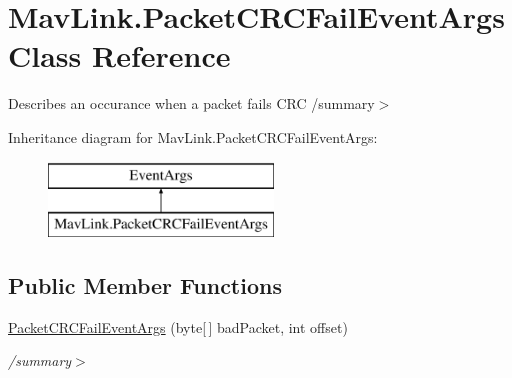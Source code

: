 \hypertarget{classMavLink_1_1PacketCRCFailEventArgs}{}\section{Mav\+Link.\+Packet\+C\+R\+C\+Fail\+Event\+Args Class Reference}
\label{classMavLink_1_1PacketCRCFailEventArgs}


Describes an occurance when a packet fails C\+RC /summary$>$  


Inheritance diagram for Mav\+Link.\+Packet\+C\+R\+C\+Fail\+Event\+Args\+:\begin{figure}[H]
\begin{center}
\leavevmode
\includegraphics[height=2.000000cm]{classMavLink_1_1PacketCRCFailEventArgs}
\end{center}
\end{figure}
\subsection*{Public Member Functions}
\begin{DoxyCompactItemize}
\item 
\mbox{\label{classMavLink_1_1PacketCRCFailEventArgs_ae4ed19b215ab5f71c63da96af562e65c}} 
\hyperlink{classMavLink_1_1PacketCRCFailEventArgs_ae4ed19b215ab5f71c63da96af562e65c}{Packet\+C\+R\+C\+Fail\+Event\+Args} (byte\mbox{[}$\,$\mbox{]} bad\+Packet, int offset)
\begin{DoxyCompactList}\small\item\em /summary$>$ \end{DoxyCompactList}\end{DoxyCompactItemize}
